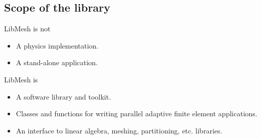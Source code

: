 \subsection*{Scope of the library}
\begin{frame}%
LibMesh is not
  \begin{itemize}
  \item {A physics implementation.}
  \item {A stand-alone application.}
  \end{itemize}
\vspace{1cm}
LibMesh is  \begin{itemize}
  \item {A software library and toolkit.}
  \item {Classes and functions for writing parallel adaptive finite element applications.}
  \item {An interface to linear algebra, meshing, partitioning, etc. libraries.}
  \end{itemize}
\end{frame}
